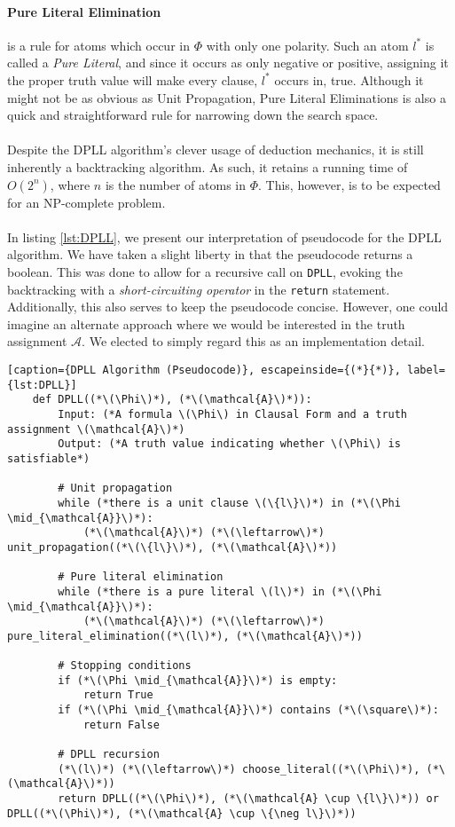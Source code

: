 \paragraph{Pure Literal Elimination} is a rule for atoms which occur in \(\Phi\) with only one polarity. Such an atom \(l^{*}\) is called a \emph{Pure Literal}, and since it occurs as only negative or positive, assigning it the proper truth value will make every clause, \(l^{*}\) occurs in, true. Although it might not be as obvious as Unit Propagation, Pure Literal Eliminations is also a quick and straightforward rule for narrowing down the search space.
\\
\\
Despite the DPLL algorithm's clever usage of deduction mechanics, it is still inherently a backtracking algorithm. As such, it retains a running time of \(O(2^n)\), where \(n\) is the number of atoms in \(\Phi\). This, however, is to be expected for an NP-complete problem.
\\
\\
In listing \ref{lst:DPLL}, we present our interpretation of pseudocode for the DPLL algorithm. We have taken a slight liberty in that the pseudocode returns a boolean. This was done to allow for a recursive call on \texttt{DPLL}, evoking the backtracking with a \emph{short-circuiting operator} in the \texttt{return} statement. Additionally, this also serves to keep the pseudocode concise. However, one could imagine an alternate approach where we would be interested in the truth assignment \(\mathcal{A}\). We elected to simply regard this as an implementation detail.

\begin{lstlisting}[caption={DPLL Algorithm (Pseudocode)}, escapeinside={(*}{*)}, label={lst:DPLL}]
    def DPLL((*\(\Phi\)*), (*\(\mathcal{A}\)*)):
        Input: (*A formula \(\Phi\) in Clausal Form and a truth assignment \(\mathcal{A}\)*)
        Output: (*A truth value indicating whether \(\Phi\) is satisfiable*)

        # Unit propagation
        while (*there is a unit clause \(\{l\}\)*) in (*\(\Phi \mid_{\mathcal{A}}\)*):
            (*\(\mathcal{A}\)*) (*\(\leftarrow\)*) unit_propagation((*\(\{l\}\)*), (*\(\mathcal{A}\)*))

        # Pure literal elimination
        while (*there is a pure literal \(l\)*) in (*\(\Phi \mid_{\mathcal{A}}\)*):
            (*\(\mathcal{A}\)*) (*\(\leftarrow\)*) pure_literal_elimination((*\(l\)*), (*\(\mathcal{A}\)*))

        # Stopping conditions
        if (*\(\Phi \mid_{\mathcal{A}}\)*) is empty:
            return True
        if (*\(\Phi \mid_{\mathcal{A}}\)*) contains (*\(\square\)*):
            return False

        # DPLL recursion
        (*\(l\)*) (*\(\leftarrow\)*) choose_literal((*\(\Phi\)*), (*\(\mathcal{A}\)*))
        return DPLL((*\(\Phi\)*), (*\(\mathcal{A} \cup \{l\}\)*)) or DPLL((*\(\Phi\)*), (*\(\mathcal{A} \cup \{\neg l\}\)*))
\end{lstlisting}


